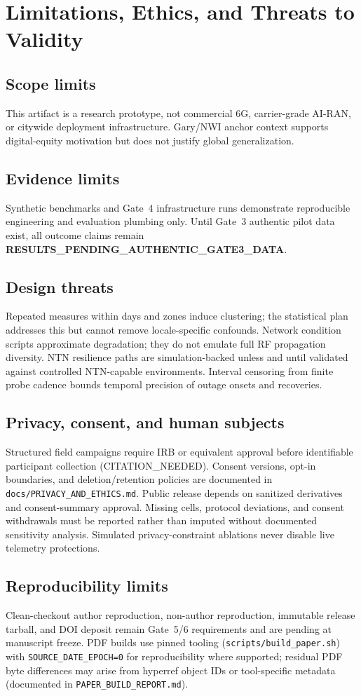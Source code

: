 \section{Limitations, Ethics, and Threats to Validity}
\label{sec:limitations}

\subsection{Scope limits}
This artifact is a research prototype, not commercial 6G, carrier-grade AI-RAN, or citywide deployment infrastructure.
Gary/NWI anchor context supports digital-equity motivation but does not justify global generalization.

\subsection{Evidence limits}
Synthetic benchmarks and Gate~4 infrastructure runs demonstrate reproducible engineering and evaluation plumbing only.
Until Gate~3 authentic pilot data exist, all outcome claims remain \textbf{RESULTS\_PENDING\_AUTHENTIC\_GATE3\_DATA}.

\subsection{Design threats}
Repeated measures within days and zones induce clustering; the statistical plan addresses this but cannot remove locale-specific confounds.
Network condition scripts approximate degradation; they do not emulate full RF propagation diversity.
NTN resilience paths are simulation-backed unless and until validated against controlled NTN-capable environments.
Interval censoring from finite probe cadence bounds temporal precision of outage onsets and recoveries.

\subsection{Privacy, consent, and human subjects}
Structured field campaigns require IRB or equivalent approval before identifiable participant collection (CITATION\_NEEDED).
Consent versions, opt-in boundaries, and deletion/retention policies are documented in \texttt{docs/PRIVACY\_AND\_ETHICS.md}.
Public release depends on sanitized derivatives and consent-summary approval.
Missing cells, protocol deviations, and consent withdrawals must be reported rather than imputed without documented sensitivity analysis.
Simulated privacy-constraint ablations never disable live telemetry protections.

\subsection{Reproducibility limits}
Clean-checkout author reproduction, non-author reproduction, immutable release tarball, and DOI deposit remain Gate~5/6 requirements and are pending at manuscript freeze.
PDF builds use pinned tooling (\texttt{scripts/build\_paper.sh}) with \texttt{SOURCE\_DATE\_EPOCH=0} for reproducibility where supported; residual PDF byte differences may arise from hyperref object IDs or tool-specific metadata (documented in \texttt{PAPER\_BUILD\_REPORT.md}).
